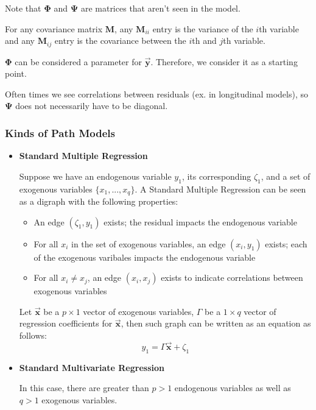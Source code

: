 \documentclass{article}
\begin{document}
\begin{multicols*}{2}
Note that $\mathbf{\Phi}$ and $\mathbf{\Psi}$ are matrices that aren't seen in the model. 

For any covariance matrix $\mathbf{M}$, any $\mathbf{M}_{ii}$ entry is the variance of the $i$th variable and any $\mathbf{M}_{ij}$ entry is the covariance between the $i$th and $j$th variable.

$\mathbf{\Phi}$ can be considered a parameter for $\mathbf{\vec{y}}$. Therefore, we consider it as a starting point.

Often times we see correlations between residuals (ex. in longitudinal models), so $\mathbf{\Psi}$ does not necessarily have to be diagonal.

\subsubsection{Kinds of Path Models}

\begin{itemize}
    \item \textbf{Standard Multiple Regression}

    Suppose we have an endogenous variable $y_1$, its corresponding $\zeta_1$, and a set of exogenous variables $\{x_1,...,x_q\}$. A Standard Multiple Regression can be seen as a digraph with the following properties:
    
    \begin{itemize}
        \item An edge $(\zeta_1, y_1)$ exists; the residual impacts the endogenous variable
        \item For all $x_i$ in the set of exogenous variables, an edge $(x_i, y_1)$ exists; each of the exogenous varibales impacts the endogenous variable
        \item For all $x_i \neq x_j$, an edge $(x_i, x_j)$ exists to indicate correlations between exogenous variables
        
    \end{itemize}
    
    Let $\mathbf{\vec{x}}$ be a $p \times 1$ vector of exogenous variables, $\Gamma$ be a $1 \times q$ vector of regression coefficients for $\mathbf{\vec{x}}$, then such graph can be written as an equation as follows: \[y_1 = \Gamma \mathbf{\vec{x}} + \zeta_1\]

    \item \textbf{Standard Multivariate Regression}
    
    In this case, there are greater than $p > 1$ endogenous variables as well as $q > 1$ exogenous variables. 
    

\end{itemize}
\end{multicols*}
\end{document}

